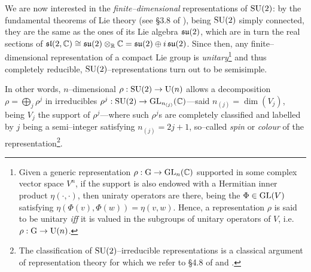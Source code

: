 {We are now interested in the \emph{finite--dimensional} representations of $\text{\normalfont SU}(2)$: by the fundamental theorems of Lie theory (see §3.8 of \cite{kirillov}), being $\text{\normalfont SU}(2)$ simply connected, they are the same as the ones of its Lie algebra $\mathfrak{su}(2)$, which are in turn the real sections of $\mathfrak{sl}(2,\mathbb{C})\cong\mathfrak{su}(2)\otimes_{\mathbb{R}}\mathbb{C}=\mathfrak{su}(2)\oplus i\,\mathfrak{su}(2)$. Since then, any finite--dimensional representation of a compact Lie group is \emph{unitary}\footnote{{Given a generic representation $\rho:\text{\normalfont G}\to\text{\normalfont GL}_n(\mathbb{C})$ supported in some complex vector space $V^n$, if the support is also endowed with a Hermitian inner product $\eta(\cdot,\cdot)$, then uniraty operators are there, being the $\Phi\in\text{\normalfont GL}(V)$ satisfying $\eta(\Phi(v),\Phi(w))=\eta(v,w)$. Hence, a representation $\rho$ is said to be unitary \emph{iff} it is valued in the subgroups of unitary operators of $V$, i.e. $\rho:\text{\normalfont G}\to\text{\normalfont U}(n)$.}} and thus completely reducible, $\text{\normalfont SU}(2)$--representations turn out to be semisimple. 

In other words, $n$--dimensional $\rho:\text{\normalfont SU}(2)\to\text{\normalfont U}(n)$ allows a decomposition $\rho=\bigoplus_j\rho^j$ in irreducibles $\rho^j:\text{\normalfont SU}(2)\to\text{\normalfont GL}_{n_{(j)}}(\mathbb{C})$---said $n_{(j)}=\dim(V_j)$, being $V_j$ the support of $\rho^j$---where such $\rho^j$s are completely classified and labelled by $j$ being a semi--integer satisfying $n_{(j)}=2j+1$, so--called \emph{spin} or \emph{colour} of the representation\footnote{The classification of $\text{\normalfont SU}(2)$--irreducible representations is a classical argument of representation theory for which we refer to §4.8 of \cite{kirillov} and \cite{LN6}.}.}




